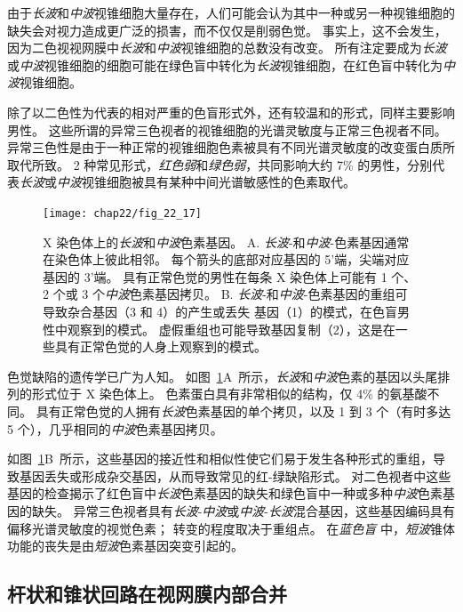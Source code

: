由于\textit{长波}和\textit{中波}视锥细胞大量存在，人们可能会认为其中一种或另一种视锥细胞的缺失会对视力造成更广泛的损害，而不仅仅是削弱色觉。
事实上，这不会发生，因为二色视视网膜中\textit{长波}和\textit{中波}视锥细胞的总数没有改变。
所有注定要成为\textit{长波}或\textit{中波}视锥细胞的细胞可能在绿色盲中转化为\textit{长波}视锥细胞，在红色盲中转化为\textit{中波}视锥细胞。


除了以二色性为代表的相对严重的色盲形式外，还有较温和的形式，同样主要影响男性。
这些所谓的异常三色视者的视锥细胞的光谱灵敏度与正常三色视者不同。
异常三色性是由于一种正常的视锥细胞色素被具有不同光谱灵敏度的改变蛋白质所取代所致。
2 种常见形式，\textit{红色弱}和\textit{绿色弱}，共同影响大约 7\% 的男性，分别代表\textit{长波}或\textit{中波}视锥细胞被具有某种中间光谱敏感性的色素取代。


\begin{figure}[htbp]
	\centering
	\texttt{[image: chap22/fig\_22\_17]}
	\caption{X 染色体上的\textit{长波}和\textit{中波}色素基因。 
		A. \textit{长波}-和\textit{中波}-色素基因通常在染色体上彼此相邻。
		每个箭头的底部对应基因的 5'端，尖端对应基因的 3'端。 
		具有正常色觉的男性在每条 X 染色体上可能有 1 个、2 个或 3 个\textit{中波}色素基因拷贝\cite{nathans1986molecular}。
		B. \textit{长波}-和\textit{中波}-色素基因的重组可导致杂合基因（3 和 4）的产生或丢失 基因（1）的模式，在色盲男性中观察到的模式。 
		虚假重组也可能导致基因复制（2），这是在一些具有正常色觉的人身上观察到的模式。}
	\label{fig:22_17}
\end{figure}


色觉缺陷的遗传学已广为人知。
如图~\ref{fig:22_17}A~所示，\textit{长波}和\textit{中波}色素的基因以头尾排列的形式位于 X 染色体上。
色素蛋白具有非常相似的结构，仅 4\% 的氨基酸不同。 
具有正常色觉的人拥有\textit{长波}色素基因的单个拷贝，以及 1 到 3 个（有时多达 5 个），几乎相同的\textit{中波}色素基因拷贝。


如图~\ref{fig:22_17}B~所示，这些基因的接近性和相似性使它们易于发生各种形式的重组，导致基因丢失或形成杂交基因，从而导致常见的红-绿缺陷形式。
对二色视者中这些基因的检查揭示了红色盲中\textit{长波}色素基因的缺失和绿色盲中一种或多种\textit{中波}色素基因的缺失。
异常三色视者具有\textit{长波}-\textit{中波}或\textit{中波}-\textit{长波}混合基因，这些基因编码具有偏移光谱灵敏度的视觉色素；
转变的程度取决于重组点。
在\textit{蓝色盲} 中，\textit{短波}锥体功能的丧失是由\textit{短波}色素基因突变引起的。



\subsection{杆状和锥状回路在视网膜内部合并}

